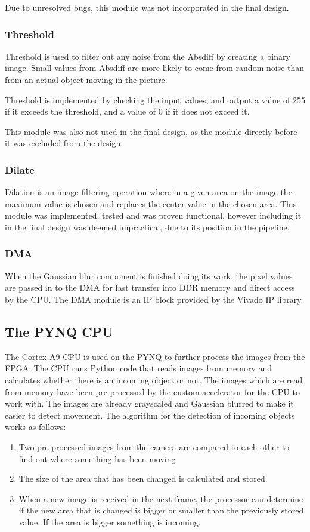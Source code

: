 Due to unresolved bugs, this module was not incorporated in the final design.

\subsubsection{Threshold}
Threshold is used to filter out any noise from the Absdiff by creating a binary image. Small values from Absdiff are more likely to come from random noise than from an actual object moving in the picture.

Threshold is implemented by checking the input values, and output a value of 255 if it exceeds the threshold, and a value of 0 if it does not exceed it.

This module was also not used in the final design, as the module directly before it was excluded from the design.

\subsubsection{Dilate}
Dilation is an image filtering operation where in a given area on the image the maximum value is chosen and replaces the center value in the chosen area. This module was implemented, tested and was proven functional, however including it in the final design was deemed impractical, due to its position in the pipeline. 
\subsubsection{DMA}
When the Gaussian blur component is finished doing its work, the pixel values are passed in to the DMA for fast transfer into DDR memory and direct access by the CPU.
The DMA module is an IP block provided by the Vivado IP library.


\subsection{The PYNQ CPU}
The Cortex-A9 CPU is used on the PYNQ to further process the images from the FPGA. The CPU runs Python code that reads images from memory and calculates whether there is an incoming object or not. The images which are read from memory have been pre-processed by the custom accelerator for the CPU to work with. The images are already grayscaled and Gaussian blurred to make it easier to detect movement. The algorithm for the detection of incoming objects works as follows:

\begin{enumerate}
    \item Two pre-processed images from the camera are compared to each other to find out where something has been moving
    \item The size of the area that has been changed is calculated and stored. 
    \item When a new image is received in the next frame, the processor can determine if the new area that is changed is bigger or smaller than the previously stored value. If the area is bigger something is incoming.
\end{enumerate}

